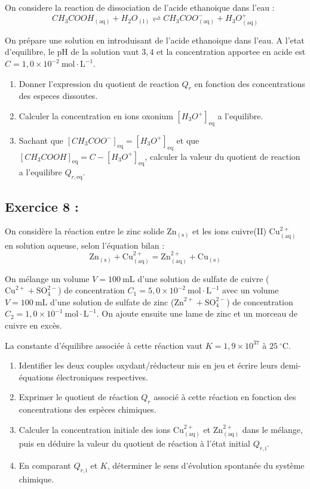 \documentclass[12pt,a4paper]{article}
\begin{document}
On considere la reaction de dissociation de l'acide ethanoique dans l'eau :
\[
CH_3COOH_{(\mathrm{aq})} + H_2O_{(\mathrm{l})} \rightleftharpoons CH_3COO^-_{(\mathrm{aq})} + H_3O^+_{(\mathrm{aq})}
\]

On prépare une solution en introduisant de l'acide ethanoique dans l'eau. A l'etat d'equilibre, le pH de la solution vaut $3{,}4$ et la concentration apportee en acide est $C = 1{,}0 \times 10^{-2}\mathrm{\ mol}\cdot\mathrm{L}^{-1}$.

\begin{enumerate}
    \item Donner l'expression du quotient de reaction $Q_r$ en fonction des concentrations des especes dissoutes.
    \item Calculer la concentration en ions oxonium $[H_3O^+]_{\mathrm{eq}}$ a l'equilibre.
    \item Sachant que $[CH_3COO^-]_{\mathrm{eq}} = [H_3O^+]_{\mathrm{eq}}$ et que $[CH_3COOH]_{\mathrm{eq}} = C - [H_3O^+]_{\mathrm{eq}}$, calculer la valeur du quotient de reaction a l'equilibre $Q_{r,\mathrm{eq}}$.
\end{enumerate}


\subsection*{Exercice 8 :}

On considère la réaction entre le zinc solide $\mathrm{Zn}_{(\mathrm{s})}$ et les ions cuivre(II) $\mathrm{Cu}^{2+}_{(\mathrm{aq})}$ en solution aqueuse, selon l'équation bilan :
\[
\mathrm{Zn}_{(\mathrm{s})} + \mathrm{Cu}^{2+}_{(\mathrm{aq})} = \mathrm{Zn}^{2+}_{(\mathrm{aq})} + \mathrm{Cu}_{(\mathrm{s})}
\]

On mélange un volume $V = 100\mathrm{\ mL}$ d'une solution de sulfate de cuivre ($\mathrm{Cu}^{2+} + \mathrm{SO}_4^{2-}$) de concentration $C_1 = 5{,}0 \times 10^{-2}\mathrm{\ mol}\cdot\mathrm{L}^{-1}$ avec un volume $V = 100\mathrm{\ mL}$ d'une solution de sulfate de zinc ($\mathrm{Zn}^{2+} + \mathrm{SO}_4^{2-}$) de concentration $C_2 = 1{,}0 \times 10^{-1}\mathrm{\ mol}\cdot\mathrm{L}^{-1}$. On ajoute ensuite une lame de zinc et un morceau de cuivre en excès.

La constante d'équilibre associée à cette réaction vaut $K = 1{,}9 \times 10^{37}$ à $25\mathrm{\ ^\circ C}$.

\begin{enumerate}
    \item Identifier les deux couples oxydant/réducteur mis en jeu et écrire leurs demi-équations électroniques respectives.
    \item Exprimer le quotient de réaction $Q_r$ associé à cette réaction en fonction des concentrations des espèces chimiques.
    \item Calculer la concentration initiale des ions $\mathrm{Cu}^{2+}_{(\mathrm{aq})}$ et $\mathrm{Zn}^{2+}_{(\mathrm{aq})}$ dans le mélange, puis en déduire la valeur du quotient de réaction à l'état initial $Q_{r,\mathrm{i}}$.
    \item En comparant $Q_{r,\mathrm{i}}$ et $K$, déterminer le sens d'évolution spontanée du système chimique.
\end{enumerate}
\end{document}
